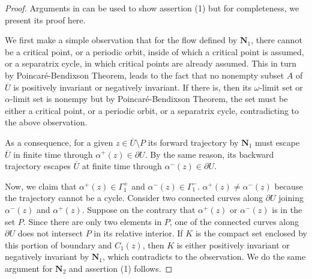 \documentclass[11pt]{amsart}
\theoremstyle{plain}
\theoremstyle{remark}
\numberwithin{equation}{section}
\numberwithin{Thm}{section}
\def\N{{\mathbf N}}
\begin{document}
\begin{proof}
 Arguments in \cite[Lemma 3,4]{lee_well-posedness_2015} can be used to show assertion (1) but for completeness, we present its proof here.
 
 We first make a simple observation that for the flow defined by $\N_1$, there cannot be  a critical point, or a periodic orbit, inside of which a critical point is assumed, or a separatrix cycle, in which critical points are already assumed. This in turn by Poincar\'e-Bendixson Theorem, leads to the fact that no nonempty subset $A$ of $\overline{U}$ is positively invariant or negatively invariant. If there is, then its $\omega$-limit set or $\alpha$-limit set is nonempy but by Poincar\'e-Bendixson Theorem, the set must be either a critical point, or a periodic orbit, or a separatrix cycle, contradicting to the above observation.
 
 As a consequence, for a given $z\in \overline{U}\setminus P$ its forward trajectory by $\N_1$ must escape $\overline{U}$ in finite time through $\alpha^+(z)\in\partial U$. By the same reason, its backward trajectory escapes $\overline{U}$ at finite time through $\alpha^-(z)\in\partial U$. %
%  

Now, we claim that $\alpha^+(z) \in \Gamma_1^+$ and $\alpha^-(z) \in \Gamma_1^-$. $\alpha^+(z)\ne \alpha^-(z)$ because the trajectory cannot be a cycle. Consider two connected curves along $\partial U$ joining $\alpha^-(z)$ and $\alpha^+(z) $. Suppose on the contrary that  $\alpha^+(z) $ or $\alpha^-(z)$ is in the set $P$. Since there are only two elements in $P$, one of the connected curves along $\partial U$ does not intersect $P$ in its relative interior. If $K$ is the compact set enclosed by this portion of boundary and $C_1(z)$, then $K$ is either positively invariant or negatively invariant by $\N_1$, which contradicts to the observation. We do the same argument for $\N_2$ and assertion (1) follows.


\end{proof}
\end{document}
